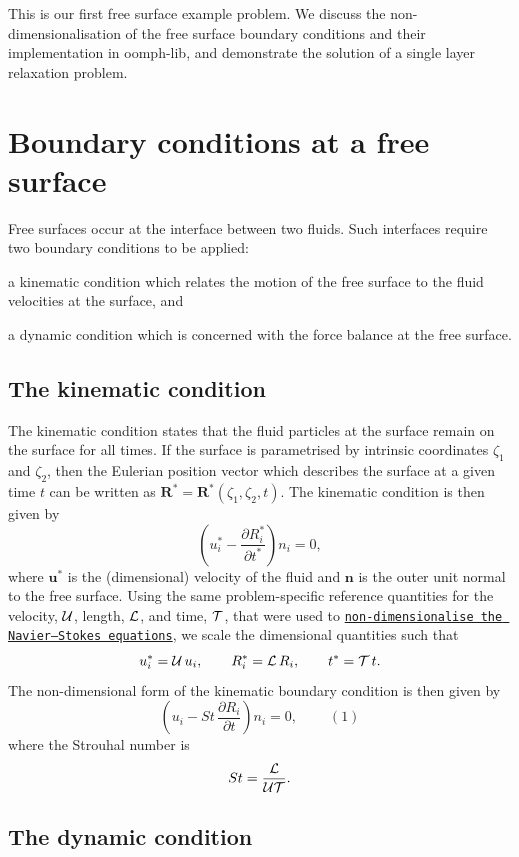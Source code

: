 This is our first free surface example problem. We discuss the non-\/dimensionalisation of the free surface boundary conditions and their implementation in {\ttfamily oomph-\/lib}, and demonstrate the solution of a single layer relaxation problem.



 

\hypertarget{index_free_surface_eqns}{}\section{Boundary conditions at a free surface}\label{index_free_surface_eqns}
Free surfaces occur at the interface between two fluids. Such interfaces require two boundary conditions to be applied\+:
\begin{DoxyEnumerate}
\item a kinematic condition which relates the motion of the free surface to the fluid velocities at the surface, and
\item a dynamic condition which is concerned with the force balance at the free surface.
\end{DoxyEnumerate}\hypertarget{index_kinematic_condition_theory}{}\subsection{The kinematic condition}\label{index_kinematic_condition_theory}
The kinematic condition states that the fluid particles at the surface remain on the surface for all times. If the surface is parametrised by intrinsic coordinates $ \zeta_1 $ and $ \zeta_2 $, then the Eulerian position vector which describes the surface at a given time $ t $ can be written as $ \mathbf{R}^* = \mathbf{R}^*(\zeta_1,\zeta_2,t) $. The kinematic condition is then given by \[ \left(u_i^*-\frac{\partial R_i^*}{\partial t^*}\right) n_i = 0, \] where $ \mathbf{u}^* $ is the (dimensional) velocity of the fluid and $ \mathbf{n} $ is the outer unit normal to the free surface. Using the same problem-\/specific reference quantities for the velocity, $ {\cal U} $, length, $ {\cal L} $, and time, ${\cal T} $, that were used to \href{../../driven_cavity/html/index.html#equation}{\tt non-\/dimensionalise the Navier--Stokes equations}, we scale the dimensional quantities such that \[ u_i^* = {\cal U} \, u_i, \qquad R_i^* = {\cal L} \, R_i, \qquad t^* = {\cal T} \, t. \] The non-\/dimensional form of the kinematic boundary condition is then given by \[ \left(u_i - St\, \frac{\partial R_i}{\partial t}\right) n_i = 0, \ \ \ \ \ \ \ \ \ \ (1) \] where the Strouhal number is \[ St = \frac{{\cal L}}{{\cal U}{\cal T}}. \]\hypertarget{index_dynamic_condition_theory}{}\subsection{The dynamic condition}\label{index_dynamic_condition_theory}
 
